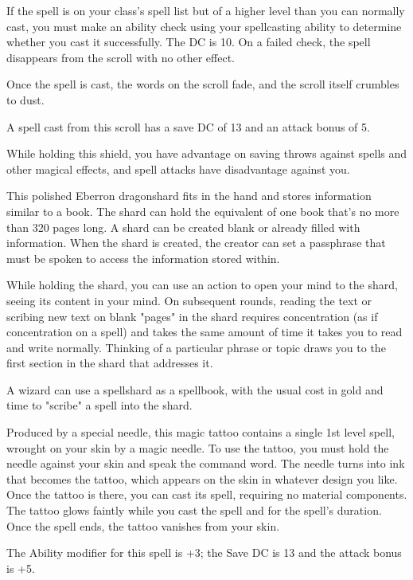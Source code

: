\documentclass[10pt,a4paper,twoside,bg=print,twocolumn,openany,nodeprecatedcode]{dndbook}
\begin{document}
If the spell is on your class's spell list but of a higher level than you can normally cast, you must make an ability check using your spellcasting ability to determine whether you cast it successfully. The DC is 10. On a failed check, the spell disappears from the scroll with no other effect.

Once the spell is cast, the words on the scroll fade, and the scroll itself crumbles to dust.

A spell cast from this scroll has a save DC of 13 and an attack bonus of 5.

While holding this shield, you have advantage on saving throws against spells and other magical effects, and spell attacks have disadvantage against you.

This polished Eberron dragonshard fits in the hand and stores information similar to a book. The shard can hold the equivalent of one book that's no more than 320 pages long. A shard can be created blank or already filled with information. When the shard is created, the creator can set a passphrase that must be spoken to access the information stored within.

While holding the shard, you can use an action to open your mind to the shard, seeing its content in your mind. On subsequent rounds, reading the text or scribing new text on blank "pages" in the shard requires concentration (as if concentration on a spell) and takes the same amount of time it takes you to read and write normally. Thinking of a particular phrase or topic draws you to the first section in the shard that addresses it.

A wizard can use a spellshard as a spellbook, with the usual cost in gold and time to "scribe" a spell into the shard.

Produced by a special needle, this magic tattoo contains a single 1st level spell, wrought on your skin by a magic needle. To use the tattoo, you must hold the needle against your skin and speak the command word. The needle turns into ink that becomes the tattoo, which appears on the skin in whatever design you like. Once the tattoo is there, you can cast its spell, requiring no material components. The tattoo glows faintly while you cast the spell and for the spell's duration. Once the spell ends, the tattoo vanishes from your skin.

The Ability modifier for this spell is +3; the Save DC is 13 and the attack bonus is +5.
\end{document}
